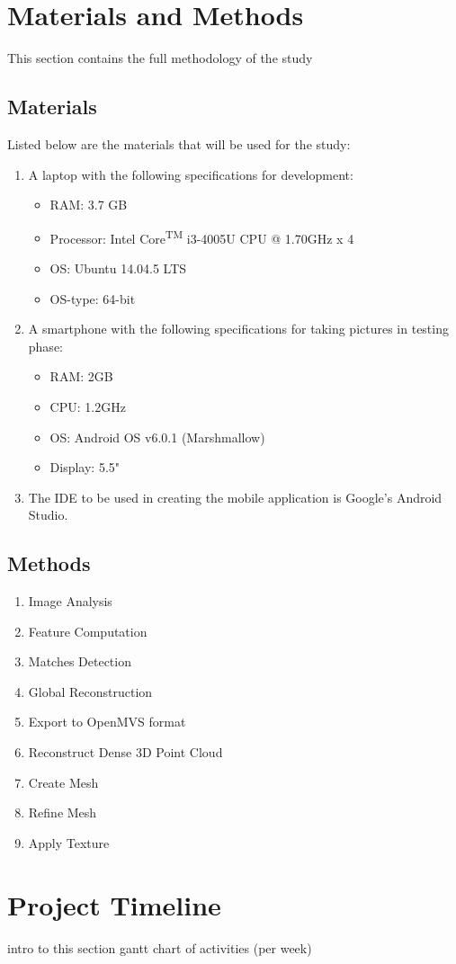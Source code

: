 \documentclass[journal]{./IEEE/IEEEtran}
\begin{document}
\section{Materials and Methods}
This section contains the full methodology of the study

\subsection{Materials}
Listed below are the materials that will be used for the study:
\begin{enumerate}
    \item A laptop with the following specifications for development:
        \begin{itemize}
            \item RAM: 3.7 GB
            \item Processor: Intel\textsuperscript{\textregistered} Core\textsuperscript{TM} i3-4005U CPU @ 1.70GHz x 4
            \item OS: Ubuntu 14.04.5 LTS
            \item OS-type: 64-bit
        \end{itemize}
        
    \item A smartphone with the following specifications for taking pictures in testing phase:
        \begin{itemize}
            \item RAM: 2GB
            \item CPU: 1.2GHz
            \item OS: Android OS v6.0.1 (Marshmallow)
            \item Display: 5.5"
        \end{itemize}
        
    \item The IDE to be used in creating the mobile application is Google's Android Studio.
\end{enumerate}

\subsection{Methods}
\begin{enumerate}
    \item Image Analysis
    \item Feature Computation
    \item Matches Detection
    \item Global Reconstruction
    \item Export to OpenMVS format
    \item Reconstruct Dense 3D Point Cloud
    \item Create Mesh
    \item Refine Mesh
    \item Apply Texture
\end{enumerate}

\section{Project Timeline}
intro to this section
gantt chart of activities (per week)



\end{document}
